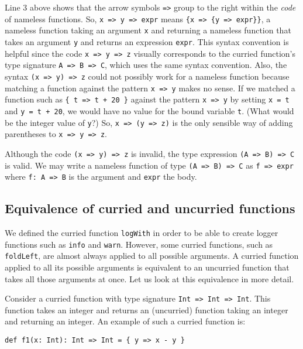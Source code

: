 Line 3 above shows that the arrow symbols \lstinline!=>! group to
the right within the \emph{code} of nameless functions. So, \lstinline!x => y => expr!
means \lstinline!{x => {y => expr}}!, a nameless function taking
an argument \lstinline!x! and returning a nameless function that
takes an argument \lstinline!y! and returns an expression \lstinline!expr!.
This syntax convention is helpful since the code \lstinline!x => y => z!
visually corresponds to the curried function\textsf{'}s type signature \lstinline!A => B => C!,
which uses the same syntax convention. Also, the syntax \lstinline!(x => y) => z!
could not possibly work for a nameless function because  matching
a function against the pattern \lstinline!x => y! makes no sense.
If we matched a function such as \lstinline!{ t => t + 20 }! against
the pattern \lstinline!x => y! by setting \lstinline!x = t! and
\lstinline!y = t + 20!, we would have no value for the bound variable
\lstinline!t!. (What would be the integer value of \lstinline!y!?)
So, \lstinline!x => (y => z)! is the only sensible way of adding
parentheses to \lstinline!x => y => z!.

Although the code \lstinline!(x => y) => z! is invalid, the type
expression \lstinline!(A => B) => C! is valid. We may write a nameless
function of type \lstinline!(A => B) => C! as \lstinline!f => expr!
where \lstinline!f: A => B! is the argument and \lstinline!expr!
the body.

\subsection{Equivalence of curried and uncurried functions}

We defined the curried function \lstinline!logWith! in order to be
able to create logger functions such as \lstinline!info! and \lstinline!warn!.
However, some curried functions, such as \lstinline!foldLeft!, are
almost always applied to all possible arguments. A curried function
applied to all its possible arguments is equivalent to an uncurried
function that takes all those arguments at once. Let us look at this
equivalence in more detail.

Consider a curried function with type signature \lstinline!Int => Int => Int!.
This function takes an integer and returns an (uncurried) function
taking an integer and returning an integer. An example of such a curried
function is:
\begin{lstlisting}
def f1(x: Int): Int => Int = { y => x - y }
\end{lstlisting}

